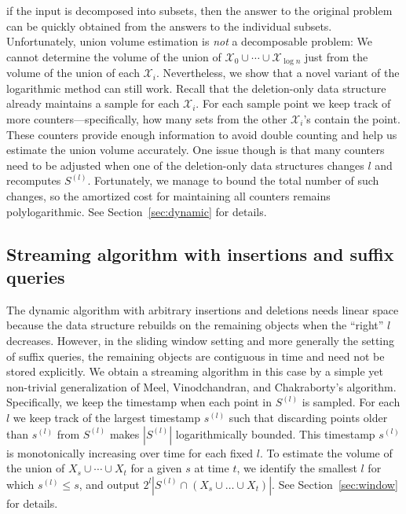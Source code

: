 \documentclass[11pt]{article}
\newcommand{\class}[1]{\mathcal{#1}}
\begin{document}
if the input is decomposed into subsets, then the answer to the original problem can be quickly obtained from the answers to the individual subsets. Unfortunately, union volume estimation is \emph{not} a decomposable problem: We cannot determine the volume of the union of $\class{X}_0\cup \cdots \cup \class{X}_{\log n}$ just from the volume of the union of each $\class{X}_i$.
%
Nevertheless, we show that a novel variant of the logarithmic method can still work. Recall that the deletion-only data structure already maintains a sample for each $\class{X}_i$. For each sample point we keep track of more counters---specifically, how many sets from the other $\class{X}_i$'s contain the point. These counters provide enough information to avoid double counting and help us estimate the union volume accurately.
One issue though is that many counters need to be adjusted when one of the deletion-only data structures changes $l$ and recomputes $S^{(l)}$. Fortunately, we manage to bound the total number of such changes, so the amortized cost for maintaining all counters remains polylogarithmic. See Section~\ref{sec:dynamic} for details.
%
\subsection{Streaming algorithm with insertions and suffix queries}
%
The dynamic algorithm with arbitrary insertions and deletions needs linear space because the data structure rebuilds on the remaining objects when the ``right'' $l$ decreases. However, in the sliding window setting and more generally the setting of suffix queries, the remaining objects are contiguous in time and need not be stored explicitly. We obtain a streaming algorithm in this case by a simple yet non-trivial generalization of Meel, Vinodchandran, and Chakraborty's algorithm. Specifically, we keep the timestamp when each point in $S^{(l)}$ is sampled. For each $l$ we keep track of the largest timestamp $s^{(l)}$ such that discarding points older than $s^{(l)}$ from $S^{(l)}$ makes $|S^{(l)}|$ logarithmically bounded. This timestamp $s^{(l)}$ is monotonically increasing over time for each fixed $l$. To estimate the volume of the union of $X_s \cup \cdots \cup X_t$ for a given $s$ at time $t$, we identify the smallest $l$ for which $s^{(l)} \leq s$, and output $2^l|S^{(l)}\cap (X_s \cup \ldots \cup X_t)|$. See Section~\ref{sec:window} for details.
%
%
\end{document}
